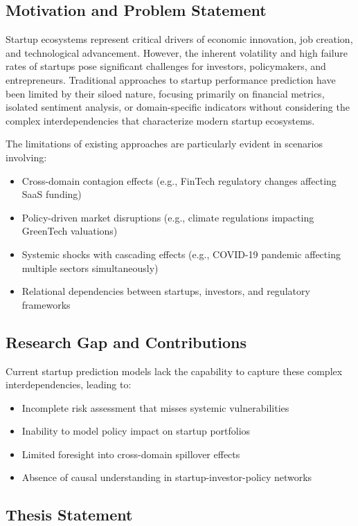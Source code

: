 \documentclass[conference]{IEEEtran}
\begin{document}
\subsection{Motivation and Problem Statement}

Startup ecosystems represent critical drivers of economic innovation, job creation, and technological advancement. However, the inherent volatility and high failure rates of startups pose significant challenges for investors, policymakers, and entrepreneurs. Traditional approaches to startup performance prediction have been limited by their siloed nature, focusing primarily on financial metrics, isolated sentiment analysis, or domain-specific indicators without considering the complex interdependencies that characterize modern startup ecosystems.

The limitations of existing approaches are particularly evident in scenarios involving:
\begin{itemize}
    \item Cross-domain contagion effects (e.g., FinTech regulatory changes affecting SaaS funding)
    \item Policy-driven market disruptions (e.g., climate regulations impacting GreenTech valuations)
    \item Systemic shocks with cascading effects (e.g., COVID-19 pandemic affecting multiple sectors simultaneously)
    \item Relational dependencies between startups, investors, and regulatory frameworks
\end{itemize}

\subsection{Research Gap and Contributions}

Current startup prediction models lack the capability to capture these complex interdependencies, leading to:
\begin{itemize}
    \item Incomplete risk assessment that misses systemic vulnerabilities
    \item Inability to model policy impact on startup portfolios
    \item Limited foresight into cross-domain spillover effects
    \item Absence of causal understanding in startup-investor-policy networks
\end{itemize}

\subsection{Thesis Statement}
\end{document}

